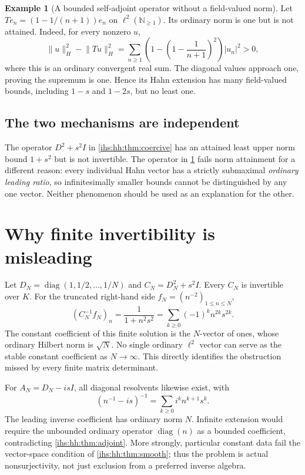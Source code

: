 \documentclass[11pt,a4paper]{article}
\numberwithin{equation}{section}
\theoremstyle{definition}
\newtheorem{example}[example]{Example}
\theoremstyle{remark}
\newcommand{\N}{\mathbb N}
\newcommand{\K}{K}
\newcommand{\diag}{\operatorname{diag}}
\newcommand{\norm}[1]{\lVert#1\rVert}
\begin{document}
\begin{example}[A bounded self-adjoint operator without a field-valued norm]\label{ihs:hh:ex:noleast}
Let $Te_n=(1-1/(n+1))e_n$ on $\ell^2(\N_{\ge1})$. Its ordinary norm is one
but is not attained. Indeed, for every nonzero $u$,
\[
 \norm{u}_H^2-\norm{Tu}_H^2
 =\sum_{n\ge1}\left(1-\left(1-\frac1{n+1}\right)^2\right)|u_n|^2>0,
\]
where this is an ordinary convergent real sum. The diagonal values approach
one, proving the supremum is one. Hence its Hahn extension has many
field-valued bounds, including $1-s$ and $1-2s$, but no least one.
\end{example}

\subsection{The two mechanisms are independent}\label{ihs:hh:sec:independent}
The operator $D^2+s^2I$ in \cref{ihs:hh:thm:coercive} has an attained least
upper norm bound $1+s^2$ but is not invertible. The operator in
\cref{ihs:hh:ex:noleast} fails norm attainment for a different reason: every
individual Hahn vector has a strictly submaximal \emph{ordinary leading
ratio}, so infinitesimally smaller bounds cannot be distinguished by any one
vector. Neither phenomenon should be used as an explanation for the other.

\section{Why finite invertibility is misleading}\label{ihs:sec:finitesections}

Let $D_N=\diag(1,1/2,\ldots,1/N)$ and $C_N=D_N^2+s^2I$. Every $C_N$ is
invertible over $\K$. For the truncated right-hand side
$f_N=(n^{-2})_{1\le n\le N}$,
\begin{equation}\label{ihs:hh:eq:finitesolution}
 (C_N^{-1}f_N)_n=\frac{1}{1+n^2s^2}=\sum_{k\ge0}(-1)^k n^{2k}s^{2k}.
\end{equation}
The constant coefficient of this finite solution is the $N$-vector of ones,
whose ordinary Hilbert norm is $\sqrt N$. No single ordinary $\ell^2$ vector
can serve as the stable constant coefficient as $N\to\infty$. This directly
identifies the obstruction missed by every finite matrix determinant.

For $A_N=D_N-isI$, all diagonal resolvents likewise exist, with
\[
 (n^{-1}-is)^{-1}=\sum_{k\ge0}i^k n^{k+1}s^k.
\]
The leading inverse coefficient has ordinary norm $N$. Infinite extension
would require the unbounded ordinary operator $\diag(n)$ as a bounded
coefficient, contradicting \cref{ihs:hh:thm:adjoint}. More strongly,
particular constant data fail the vector-space condition of
\cref{ihs:hh:thm:smooth}; thus the problem is actual nonsurjectivity, not
just exclusion from a preferred inverse algebra.
\end{document}
